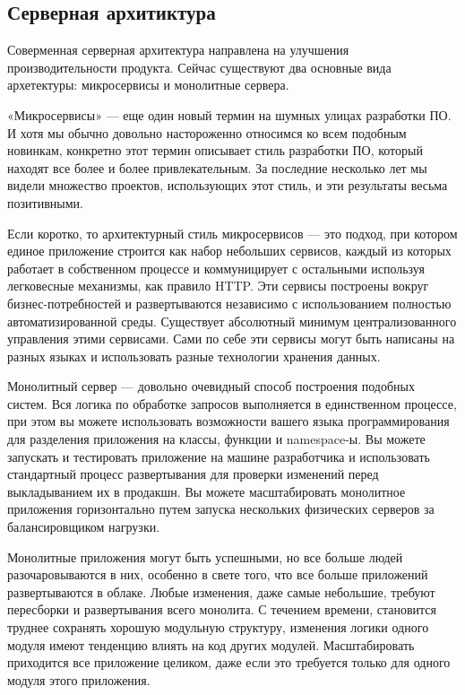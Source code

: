 \subsection{Серверная архитиктура}
\label{sec:analysis:serv_arch}

Соверменная серверная архитектура направлена на улучшения производительности продукта. Сейчас существуют два основные вида архетектуры: микросервисы и монолитные сервера.

«Микросервисы» — еще один новый термин на шумных улицах разработки ПО. И хотя мы обычно довольно настороженно относимся ко всем подобным новинкам, конкретно этот термин описывает стиль разработки ПО, который находят все более и более привлекательным. За последние несколько лет мы видели множество проектов, использующих этот стиль, и эти результаты весьма позитивными.

Если коротко, то архитектурный стиль микросервисов — это подход, при котором единое приложение строится как набор небольших сервисов, каждый из которых работает в собственном процессе и коммуницирует с остальными используя легковесные механизмы, как правило HTTP. Эти сервисы построены вокруг бизнес-потребностей и развертываются независимо с использованием полностью автоматизированной среды. Существует абсолютный минимум централизованного управления этими сервисами. Сами по себе эти сервисы могут быть написаны на разных языках и использовать разные технологии хранения данных.

Монолитный сервер — довольно очевидный способ построения подобных систем. Вся логика по обработке запросов выполняется в единственном процессе, при этом вы можете использовать возможности вашего языка программирования для разделения приложения на классы, функции и namespace-ы. Вы можете запускать и тестировать приложение на машине разработчика и использовать стандартный процесс развертывания для проверки изменений перед выкладыванием их в продакшн. Вы можете масштабировать монолитное приложения горизонтально путем запуска нескольких физических серверов за балансировщиком нагрузки.

Монолитные приложения могут быть успешными, но все больше людей разочаровываются в них, особенно в свете того, что все больше приложений развертываются в облаке. Любые изменения, даже самые небольшие, требуют пересборки и развертывания всего монолита. С течением времени, становится труднее сохранять хорошую модульную структуру, изменения логики одного модуля имеют тенденцию влиять на код других модулей. Масштабировать приходится все приложение целиком, даже если это требуется только для одного модуля этого приложения.
